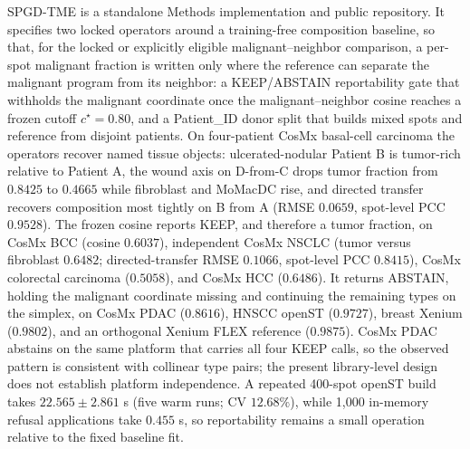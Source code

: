 SPGD-TME is a standalone Methods implementation and public repository. It specifies two locked operators around a training-free composition baseline, so that, for the locked or explicitly eligible malignant--neighbor comparison, a per-spot malignant fraction is written only where the reference can separate the malignant program from its neighbor: a KEEP/ABSTAIN reportability gate that withholds the malignant coordinate once the malignant--neighbor cosine reaches a frozen cutoff \(c^\star=0.80\), and a Patient\_ID donor split that builds mixed spots and reference from disjoint patients. On four-patient CosMx basal-cell carcinoma the operators recover named tissue objects: ulcerated-nodular Patient B is tumor-rich relative to Patient A, the wound axis on D-from-C drops tumor fraction from \(0.8425\) to \(0.4665\) while fibroblast and MoMacDC rise, and directed transfer recovers composition most tightly on B from A (RMSE \(0.0659\), spot-level PCC \(0.9528\)). The frozen cosine reports KEEP, and therefore a tumor fraction, on CosMx BCC (cosine \(0.6037\)), independent CosMx NSCLC (tumor versus fibroblast \(0.6482\); directed-transfer RMSE \(0.1066\), spot-level PCC \(0.8415\)), CosMx colorectal carcinoma (\(0.5058\)), and CosMx HCC (\(0.6486\)). It returns ABSTAIN, holding the malignant coordinate missing and continuing the remaining types on the simplex, on CosMx PDAC (\(0.8616\)), HNSCC openST (\(0.9727\)), breast Xenium (\(0.9802\)), and an orthogonal Xenium FLEX reference (\(0.9875\)). CosMx PDAC abstains on the same platform that carries all four KEEP calls, so the observed pattern is consistent with collinear type pairs; the present library-level design does not establish platform independence. A repeated 400-spot openST build takes \(22.565\pm2.861\) s (five warm runs; CV \(12.68\%\)), while 1,000 in-memory refusal applications take \(0.455\) s, so reportability remains a small operation relative to the fixed baseline fit.
